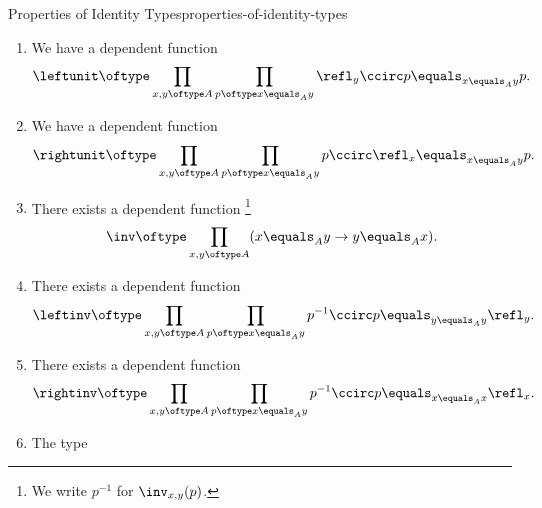 \begin{proposition}{Properties of Identity Types}{properties-of-identity-types}
\begin{enumerate}
\[                \prod_{\substack{p\oftype w\equals_{A}x\\q\oftype x\equals_{A}y\\r\oftype y\equals_{A}z}}%
                (r\ccirc q)\ccirc p%
                \equals_{w\equals_{a}z}%
                r\ccirc(q\ccirc p).%
            \]%
        \item\label{properties-of-identity-types-left-unitality}We have a dependent function
            \[
                \leftunit%
                \oftype%
                \prod_{x,y\oftype A}\prod_{p\oftype x\equals_{A}y}\refl_{y}\ccirc p\equals_{x\equals_{A}y}p.%
            \]%
        \item\label{properties-of-identity-types-right-unitality}We have a dependent function
            \[
                \rightunit%
                \oftype%
                \prod_{x,y\oftype A}\prod_{p\oftype x\equals_{A}y}p\ccirc\refl_{x}\equals_{x\equals_{A}y}p.%
            \]%
        \item\label{properties-of-identity-types-inversion}There exists a dependent function%
            \footnote{%
                We write $p^{-1}$ for $\inv_{x,y}(p)$.
                \par\vspace*{\TCBBoxCorrection}
            }%
            \[
                \inv%
                \oftype%
                \prod_{x,y\oftype A}(x\equals_{A}y\to y\equals_{A}x).%
            \]%
        \item\label{properties-of-identity-types-left-invertibility}There exists a dependent function
            \[
                \leftinv%
                \oftype%
                \prod_{x,y\oftype A}\prod_{p\oftype x\equals_{A}y}p^{-1}\ccirc p\equals_{y\equals_{A}y}\refl_{y}.%
            \]%
        \item\label{properties-of-identity-types-right-invertibility}There exists a dependent function
            \[
                \rightinv%
                \oftype%
                \prod_{x,y\oftype A}\prod_{p\oftype x\equals_{A}y}p^{-1}\ccirc p\equals_{x\equals_{A}x}\refl_{x}.%
            \]%
        \item\label{properties-of-identity-types-uniqueness-of-refl}The type%

\end{enumerate}
\end{proposition}
